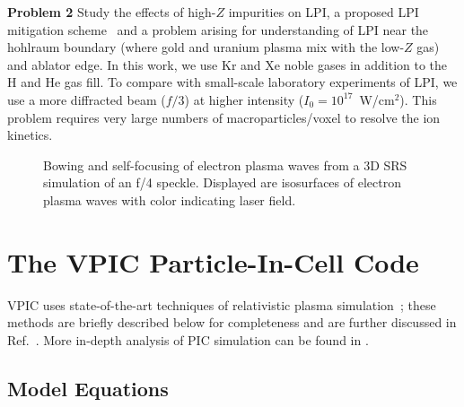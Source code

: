 \documentclass[10pt]{article}
\begin{document}
\textbf{Problem 2}
Study the effects of high-$Z$ impurities on LPI, a proposed
LPI mitigation scheme~\cite{Lushnikov_PPCF_2006} and a problem 
arising for understanding of LPI near the hohlraum boundary (where gold 
and uranium plasma mix with the low-$Z$ gas) and ablator edge.  In 
this work, we use Kr and Xe noble gases in addition to the H and He gas
fill.  To compare with small-scale laboratory experiments of LPI, we
use a more diffracted beam ($f/3$) at higher intensity ($I_0 =
10^{17}$~W/cm$^2$). This problem requires very large numbers of
macroparticles/voxel to resolve the ion kinetics.




\begin{figure}
    \begin{center}
    \caption{Bowing and self-focusing of electron plasma waves from 
		a 3D SRS simulation of an f/4 speckle. Displayed are 
		isosurfaces of electron plasma waves with color 
		indicating laser field.}
    \label{fig:lpi}
    \end{center}
\end{figure}


\section{The VPIC Particle-In-Cell Code}

VPIC uses state-of-the-art techniques of relativistic plasma 
simulation~\cite{Blahovec_et_al_2000,Eastwood_et_al_1995,Jones_et_al_1996,Kwan_Snell_1985,Nieter_Cary_2004,Verboncoeur_et_al_1995}; 
these methods are briefly described below for completeness and are
further discussed in Ref.~\cite{Bowers_et_al_Phys_Plasmas_2007}.  More
in-depth analysis of PIC simulation can be found in
\cite{Birdsall_Langdon_1985,Hockney_Eastwood_1988}.

\subsection{Model Equations}
\end{document}
